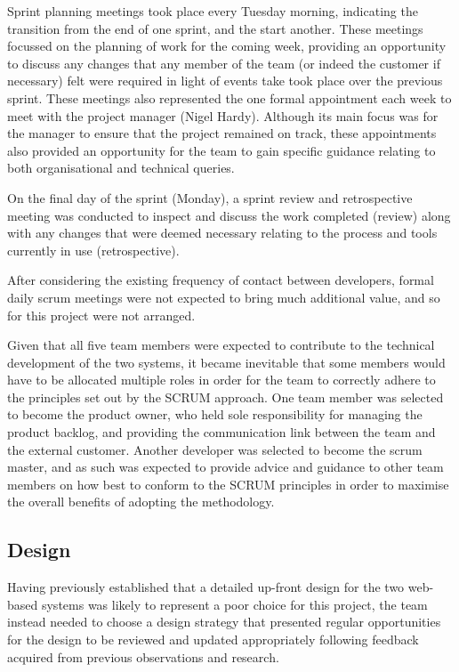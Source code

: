 Sprint planning meetings took place every Tuesday morning, indicating the transition from the end of one sprint, and the start another. These meetings focussed on the planning of work for the coming week, providing an opportunity to discuss any changes that any member of the team (or indeed the customer if necessary) felt were required in light of events take took place over the previous sprint. These meetings also represented the one formal appointment each week to meet with the project manager (Nigel Hardy). Although its main focus was for the manager to ensure that the project remained on track, these appointments also provided an opportunity for the team to gain specific guidance relating to both organisational and technical queries.

On the final day of the sprint (Monday), a sprint review and retrospective meeting was conducted to inspect and discuss the work completed (review) along with any changes that were deemed necessary relating to the process and tools currently in use (retrospective). 

After considering the existing frequency of contact between developers, formal daily scrum meetings were not expected to bring much additional value, and so for this project were not arranged.

Given that all five team members were expected to contribute to the technical development of the two systems, it became inevitable that some members would have to be allocated multiple roles in order for the team to correctly adhere to the principles set out by the SCRUM approach. One team member was selected to become the product owner, who held sole  responsibility for managing the product backlog, and providing the communication link between the team and the external customer. Another developer was selected to become the scrum master, and as such was expected to provide advice and guidance to other team members on how best to conform to the SCRUM principles in order to maximise the overall benefits of adopting the methodology.

\subsection{Design}

Having previously established that a detailed up-front design for the two web-based systems was likely to represent a poor choice for this project, the team instead needed to choose a design strategy that presented regular opportunities for the design to be reviewed and updated appropriately following feedback acquired from previous observations and research.

